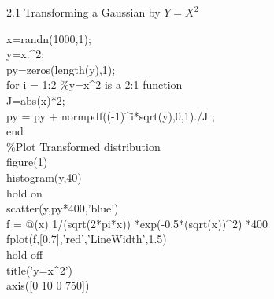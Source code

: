 \documentclass[twoside,twocolumn]{article}
\begin{document}
\begin{large}
2.1 Transforming a Gaussian by $Y=X^2$
\end{large}
\newline
\begin{itshape}
x=randn(1000,1);\\
y=x.\^{}2;   \\
py=zeros(length(y),1);\\
for i = 1:2 \%y=x\^{}2 is a 2:1 function\\
    J=abs(x)*2;\\
    py = py + normpdf((-1)\^{}i*sqrt(y),0,1)./J ;\\
end\\

\%Plot Transformed distribution\\
figure(1)\\
histogram(y,40)\\
hold on\\
scatter(y,py*400,'blue')\\
f = @(x) 1/(sqrt(2*pi*x)) *exp(-0.5*(sqrt(x))\^{}2) *400\\
fplot(f,[0,7],'red','LineWidth',1.5)\\
hold off\\
title('y=x\^{}2')\\
axis([0 10 0 750])\\
\end{itshape}
\end{document}
